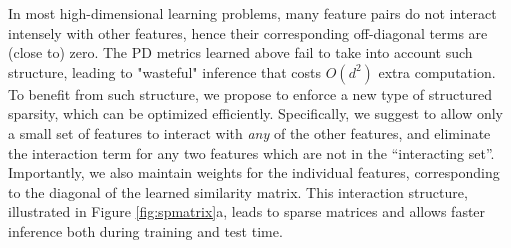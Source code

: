 \documentclass[twoside,11pt]{article}
\newcommand{\ignore}[1]{}
\begin{document}
\ignore{
The PD metric learned above does not take into account possible structures often found in feature interactions. }

In most high-dimensional learning problems, many feature pairs do not interact intensely with other features, hence their corresponding off-diagonal terms are (close to) zero. The PD metrics learned above fail to take into account such structure, leading to  "wasteful" inference that costs $O(d^2)$ extra computation. To benefit from such structure, we propose to enforce a new type of structured sparsity, which can be optimized efficiently. Specifically, we suggest to allow only a small set of features to interact with \emph{any} of the other features, and eliminate the interaction term for any two features which are not in the ``interacting set''. Importantly, we also maintain weights for the individual features, corresponding to the diagonal of the learned similarity matrix. This interaction structure,  illustrated in Figure \ref{fig:spmatrix}a, leads to sparse matrices and allows faster inference both during training and test time.
\end{document}
